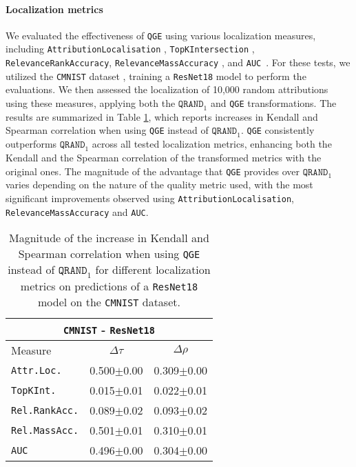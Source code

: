 \paragraph{Localization metrics}
We evaluated the effectiveness of \texttt{QGE} using various localization measures, including \texttt{AttributionLocalisation} \cite{kohlbrenner2020towards}, \texttt{TopKIntersection} \cite{theiner2021}, \texttt{RelevanceRankAccuracy}, \texttt{RelevanceMassAccuracy} \cite{arras2021ground}, and \texttt{AUC}~\cite{Fawcett}. For these tests, we utilized the \texttt{CMNIST} dataset \cite{bykov2021noisegrad}, training a \texttt{ResNet18} model to perform the evaluations. We then assessed the localization of 10,000 random attributions using these measures, applying both the $\texttt{QRAND}_1$ and \texttt{QGE} transformations. The results are summarized in Table \ref{tab:effects_localization}, which reports increases in Kendall and Spearman correlation when using \texttt{QGE} instead of $\texttt{QRAND}_1$. \texttt{QGE} consistently outperforms $\texttt{QRAND}_1$ across all tested localization metrics, enhancing both the Kendall and the Spearman correlation of the transformed metrics with the original ones. The magnitude of the advantage that \texttt{QGE} provides over $\texttt{QRAND}_1$ varies depending on the nature of the quality metric used, with the most significant improvements observed using \texttt{AttributionLocalisation}, \texttt{RelevanceMassAccuracy} and \texttt{AUC}.

\begin{table}[!t]
    \vskip 0.15in
    \begin{center}
    \begin{small}
    \begin{sc}
    \begin{tabular}{l|c|c}
        \multicolumn{3}{c}{\texttt{CMNIST} - \texttt{ResNet18}}\\
        \toprule
        Measure &$\Delta \tau$ & $\Delta\rho$\\
        \hline
        \texttt{Attr.Loc.} & 0.500$\pm$0.00 & 0.309$\pm$0.00\\
        \texttt{TopKInt.} & 0.015$\pm$0.01 & 0.022$\pm$0.01\\
        \texttt{Rel.RankAcc.} & 0.089$\pm$0.02 & 0.093$\pm$0.02\\
        \texttt{Rel.MassAcc.} & 0.501$\pm$0.01 & 0.310$\pm$0.01\\
        \texttt{AUC} & 0.496$\pm$0.00 & 0.304$\pm$0.00\\
        \hline
    \end{tabular}
    \end{sc}
    \end{small}
    \end{center}
    \caption{Magnitude of the increase in Kendall and Spearman correlation when using \texttt{QGE} instead of $\texttt{QRAND}_1$ for different localization metrics %
    on predictions of a \texttt{ResNet18} model on the \texttt{CMNIST} dataset.}
    \label{tab:effects_localization}
\end{table}

